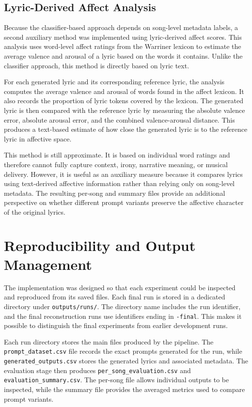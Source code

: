 \subsection{Lyric-Derived Affect Analysis}

Because the classifier-based approach depends on song-level metadata labels, a second auxiliary method was implemented using lyric-derived affect scores. This analysis uses word-level affect ratings from the Warriner lexicon to estimate the average valence and arousal of a lyric based on the words it contains. Unlike the classifier approach, this method is directly based on lyric text.

For each generated lyric and its corresponding reference lyric, the analysis computes the average valence and arousal of words found in the affect lexicon. It also records the proportion of lyric tokens covered by the lexicon. The generated lyric is then compared with the reference lyric by measuring the absolute valence error, absolute arousal error, and the combined valence-arousal distance. This produces a text-based estimate of how close the generated lyric is to the reference lyric in affective space.

This method is still approximate. It is based on individual word ratings and therefore cannot fully capture context, irony, narrative meaning, or musical delivery. However, it is useful as an auxiliary measure because it compares lyrics using text-derived affective information rather than relying only on song-level metadata. The resulting per-song and summary files provide an additional perspective on whether different prompt variants preserve the affective character of the original lyrics.


\section{Reproducibility and Output Management}

The implementation was designed so that each experiment could be inspected and reproduced from its saved files. Each final run is stored in a dedicated directory under \texttt{outputs/runs/}. The directory name includes the run identifier, and the final reconstruction runs use identifiers ending in \texttt{-final}. This makes it possible to distinguish the final experiments from earlier development runs.

Each run directory stores the main files produced by the pipeline. The \texttt{prompt\_dataset.csv} file records the exact prompts generated for the run, while \texttt{generated\_outputs.csv} stores the generated lyrics and associated metadata. The evaluation stage then produces \texttt{per\_song\_evaluation.csv} and \texttt{evaluation\_summary.csv}. The per-song file allows individual outputs to be inspected, while the summary file provides the averaged metrics used to compare prompt variants.

